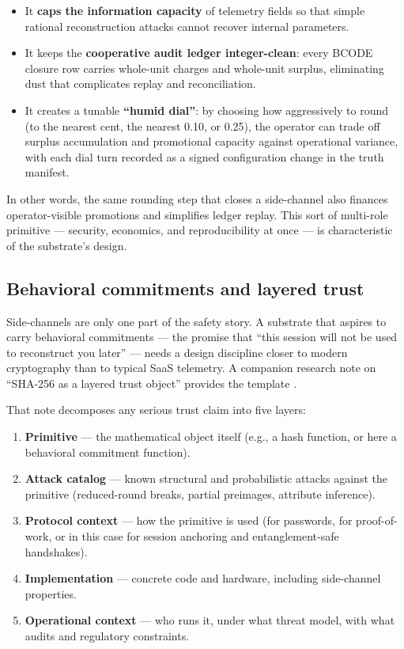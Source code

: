 \documentclass{article}
\providecommand{\tightlist}{\setlength{\itemsep}{0pt}\setlength{\parskip}{0pt}}
\begin{document}
\begin{itemize}
\tightlist
\item
  It \textbf{caps the information capacity} of telemetry fields so that
  simple rational reconstruction attacks cannot recover internal
  parameters.
\item
  It keeps the \textbf{cooperative audit ledger integer-clean}: every
  BCODE closure row carries whole-unit charges and whole-unit surplus,
  eliminating dust that complicates replay and reconciliation.
\item
  It creates a tunable \textbf{``humid dial''}: by choosing how
  aggressively to round (to the nearest cent, the nearest 0.10, or
  0.25), the operator can trade off surplus accumulation and promotional
  capacity against operational variance, with each dial turn recorded as
  a signed configuration change in the truth manifest.
\end{itemize}

In other words, the same rounding step that closes a side-channel also
finances operator-visible promotions and simplifies ledger replay. This
sort of multi-role primitive --- security, economics, and
reproducibility at once --- is characteristic of the substrate's design.

\subsection{Behavioral commitments and layered
trust}\label{behavioral-commitments-and-layered-trust}

Side-channels are only one part of the safety story. A substrate that
aspires to carry behavioral commitments --- the promise that ``this
session will not be used to reconstruct you later'' --- needs a design
discipline closer to modern cryptography than to typical SaaS telemetry.
A companion research note on ``SHA-256 as a layered trust object''
provides the template \citep{wp3_sha256_layered_trust}.

That note decomposes any serious trust claim into five layers:

\begin{enumerate}
\def\labelenumi{\arabic{enumi}.}
\tightlist
\item
  \textbf{Primitive} --- the mathematical object itself (e.g., a hash
  function, or here a behavioral commitment function).
\item
  \textbf{Attack catalog} --- known structural and probabilistic attacks
  against the primitive (reduced-round breaks, partial preimages,
  attribute inference).
\item
  \textbf{Protocol context} --- how the primitive is used (for
  passwords, for proof-of-work, or in this case for session anchoring
  and entanglement-safe handshakes).
\item
  \textbf{Implementation} --- concrete code and hardware, including
  side-channel properties.
\item
  \textbf{Operational context} --- who runs it, under what threat model,
  with what audits and regulatory constraints.
\end{enumerate}
\end{document}
